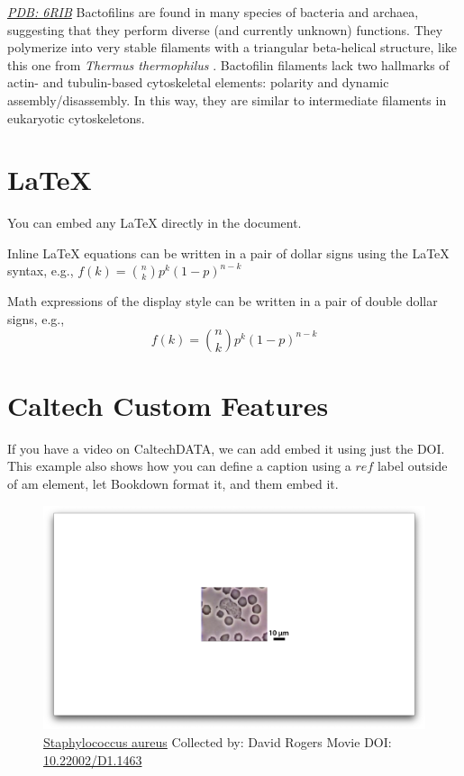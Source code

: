 \documentclass[]{tufte-book}
\begin{document}
\href{http://rcsb.org/structure/6RIB}{\emph{PDB: 6RIB}} Bactofilins are
found in many species of bacteria and archaea, suggesting that they
perform diverse (and currently unknown) functions. They polymerize into
very stable filaments with a triangular beta-helical structure, like
this one from \emph{Thermus thermophilus} \citep{deng2019}. Bactofilin
filaments lack two hallmarks of actin- and tubulin-based cytoskeletal
elements: polarity and dynamic assembly/disassembly. In this way, they
are similar to intermediate filaments in eukaryotic cytoskeletons.

\section{LaTeX}\label{latex}

You can embed any LaTeX directly in the document.

Inline LaTeX equations can be written in a pair of dollar signs using
the LaTeX syntax, e.g., \(f(k) = {n \choose k} p^{k} (1-p)^{n-k}\)

Math expressions of the display style can be written in a pair of double
dollar signs, e.g., \[f(k) = {n \choose k} p^{k} (1-p)^{n-k}\]

\section{Caltech Custom Features}\label{caltech-custom-features}

If you have a video on CaltechDATA, we can add embed it using just the
DOI. This example also shows how you can define a caption using a
\(ref\) label outside of am element, let Bookdown format it, and them
embed it.





\begin{figure}
\includegraphics{movie_stills/1_1} \caption[\protect\hyperlink{methods}{Staphylococcus aureus} Collected
by: David Rogers Movie DOI:
\href{https://doi.org/10.22002/D1.1463}{10.22002/D1.1463}]{\protect\hyperlink{methods}{Staphylococcus aureus} Collected
by: David Rogers Movie DOI:
\href{https://doi.org/10.22002/D1.1463}{10.22002/D1.1463}}\label{fig:1-1}
\end{figure}
\end{document}
